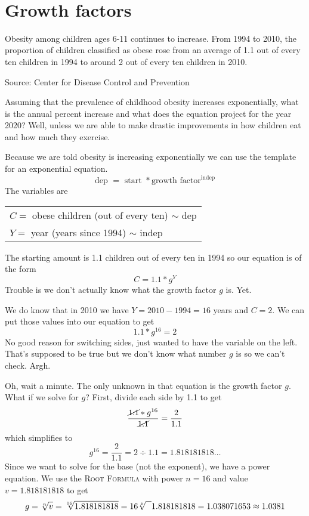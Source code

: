 ~\vspace{.1in}

\section{Growth factors}

Obesity among children ages 6-11 continues to increase.  From 1994 to 2010, the proportion of children classified as obese rose from an average of 1.1 out of every ten children in 1994 to around 2 out of every ten children in 2010.  

\hfill \begin{footnotesize} Source:  Center for Disease Control and Prevention \end{footnotesize}

Assuming that the prevalence of childhood obesity increases exponentially, what is the annual percent increase and what does the equation project for the year 2020? Well, unless we are able to make drastic improvements in how children eat and how much they exercise.

Because we are told obesity is increasing exponentially we can use the template for an exponential equation.  
$$\text{dep }=\text{ start } \ast \text{growth factor}^{\text{indep}}$$
The variables are 
\begin{center}
\begin{tabular} {l} 
$C=$ obese children (out of every ten) $\sim$ dep \\ 
$Y =$ year (years since 1994) $\sim$ indep \\
\end{tabular}
\end{center}
The starting amount  is 1.1 children out of every ten in 1994 so our equation is of the form $$C = 1.1 \ast g^Y$$
Trouble is we don't actually know what the growth factor $g$ is.  Yet.  

We do know that in 2010 we have $Y = 2010 - 1994 = 16$ years and $C = 2$.  We can put those values into our equation to get $$1.1 \ast g^{16}=2$$
No good reason for switching sides, just wanted to have the variable on the left.
That's supposed to be true but we don't know what number $g$ is so we can't check.  Argh.  

Oh, wait a minute.  The only unknown in that equation is the growth factor $g$.  What if we solve for $g$?  First, divide each side by  1.1 to get
$$ \frac{\cancel{1.1}\ast g^{16}}{\cancel{1.1}} = \frac{2}{1.1} $$
which simplifies to $$g^{16} = \frac{2}{1.1} = 2 \div 1.1= 1.818181818\ldots$$
Since we want to solve for the base (not the exponent), we have a power equation.  We use the \textsc{Root Formula} with power $n=16$ and value $v=1.818181818$ to get
$$g = \sqrt[n]{v} = \sqrt[16]{1.818181818} = 16 \sqrt[x]{\text{\raisebox{.6em}{~\text{  }}}} 1.818181818 = 1.038071653 \approx 1.0381$$  

